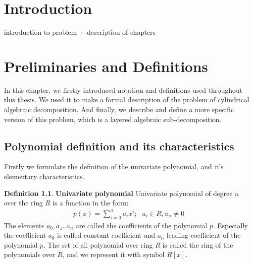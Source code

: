 \documentclass[
  digital, %
  twoside, %
  table,   %
  nolof,     %
  nolot,     %
]{fithesis3}
\begin{document}
\chapter*{Introduction}
introduction to problem + 
description of chapters



\newtheorem{theorem}{Theorem}[section] %
\newtheorem{lemma}[theorem]{Lemma}         %
\newtheorem{corollary}[theorem]{Corollary} %
\theoremstyle{definition}
\newtheorem{definition}{Definition}
\theoremstyle{remark}
\newtheorem*{remark}{Remark}


\chapter{Preliminaries and Definitions}
In this chapter, we firstly introduced notation and definitions used throughout this thesis. We used it to make a formal description of the problem of cylindrical algebraic decomposition. And finally, we describe and define a more specific version of this problem, which is a layered algebraic sub-decomposition.
\section{Polynomial definition and its characteristics}
Firstly we formulate the definition of the univariate polynomial, and it's elementary characteristics.
\begin{definition}{\textbf{Univariate polynomial}}
\newline
Univariate polynomial of degree $n$ over the ring $R$ is a function in the form:
\begin{align*}
p(x) =  \sum_{i=0}^n a_ix^i;\ \ \  a_i \in R, a_n \neq 0 
\end{align*}
The elements $a_0, a_1 .. a_n$ are called the coefficients of the polynomial $p$. Especially the coefficient $a_0$ is called constant coefficient and $a_n$ leading coefficient of the polynomial $p$.
\newline\newline
The set of all polynomial over ring $R$ is called the ring of the polynomials over $R$, and we represent it with symbol $R[x]$.
\end{definition}
\end{document}
